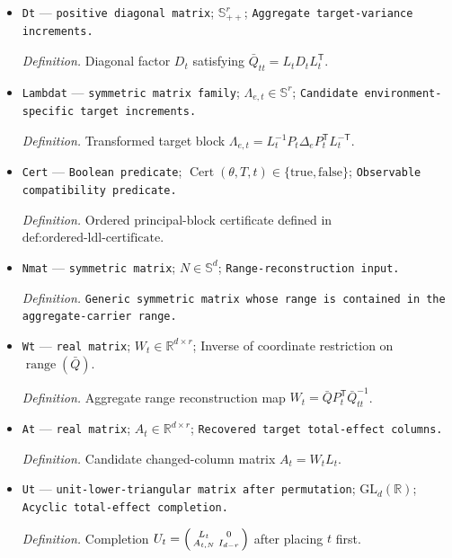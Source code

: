 \documentclass{article}
\begin{document}
\begin{itemize}
  \par\smallskip\noindent\emph{Definition.} Unit-lower factor \(L_t\) in the positive \(LDL^{\mathsf T}\) factorization of \(\bar Q_{tt}\).
  \item \texttt{Dt} --- \texttt{positive diagonal matrix}; \(\mathbb S_{++}^r\); \texttt{Aggregate target-\allowbreak{}variance increments.}
  \par\smallskip\noindent\emph{Definition.} Diagonal factor \(D_t\) satisfying \(\bar Q_{tt}=L_tD_tL_t^{\mathsf T}\).
  \item \texttt{Lambdat} --- \texttt{symmetric matrix family}; \(\Lambda_{e,t}\in\mathbb S^r\); \texttt{Candidate environment-\allowbreak{}specific target increments.}
  \par\smallskip\noindent\emph{Definition.} Transformed target block \(\Lambda_{e,t}=L_t^{-1}P_t\Delta_eP_t^{\mathsf T}L_t^{-\mathsf T}\).
  \item \texttt{Cert} --- \texttt{Boolean predicate}; \(\operatorname{Cert}(\theta,T,t)\in\{\mathrm{true},\mathrm{false}\}\); \texttt{Observable compatibility predicate.}
  \par\smallskip\noindent\emph{Definition.} Ordered principal-block certificate defined in \(\text{def:ordered-ldl-certificate}\).
  \item \texttt{Nmat} --- \texttt{symmetric matrix}; \(N\in\mathbb S^d\); \texttt{Range-\allowbreak{}reconstruction input.}
  \par\smallskip\noindent\emph{Definition.} \texttt{Generic symmetric matrix whose range is contained in the aggregate-\allowbreak{}carrier range.}
  \item \texttt{Wt} --- \texttt{real matrix}; \(W_t\in\mathbb R^{d\times r}\); Inverse of coordinate restriction on \(\operatorname{range}(\bar Q)\).
  \par\smallskip\noindent\emph{Definition.} Aggregate range reconstruction map \(W_t=\bar QP_t^{\mathsf T}\bar Q_{tt}^{-1}\).
  \item \texttt{At} --- \texttt{real matrix}; \(A_t\in\mathbb R^{d\times r}\); \texttt{Recovered target total-\allowbreak{}effect columns.}
  \par\smallskip\noindent\emph{Definition.} Candidate changed-column matrix \(A_t=W_tL_t\).
  \item \texttt{Ut} --- \texttt{unit-\allowbreak{}lower-\allowbreak{}triangular matrix after permutation}; \(\mathrm{GL}_d(\mathbb R)\); \texttt{Acyclic total-\allowbreak{}effect completion.}
  \par\smallskip\noindent\emph{Definition.} Completion \(U_t=\begin{psmallmatrix}L_t&0\\A_{t,N}&I_{d-r}\end{psmallmatrix}\) after placing \(t\) first.

\end{itemize}
\end{document}
